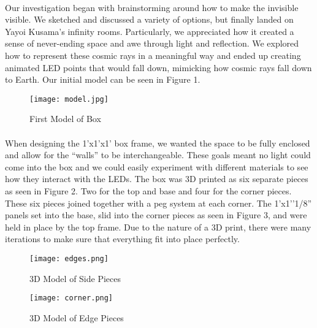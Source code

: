 \documentclass{article}
\begin{document}
\paragraph{}Our investigation began with brainstorming around how to make the invisible visible. We sketched and discussed a variety of options, but finally landed on Yayoi Kusama’s infinity rooms. Particularly, we appreciated how it created a sense of never-ending space and awe through light and reflection. We explored how to represent these cosmic rays in a meaningful way and ended up creating animated LED points that would fall down, mimicking how cosmic rays fall down to Earth. Our initial model can be seen in Figure 1.
\begin{figure}
    \centering
    \texttt{[image: model.jpg]}
    \caption{First Model of Box}
\end{figure}
\paragraph{}When designing the 1’x1’x1’ box frame, we wanted the space to be fully enclosed and allow for the “walls” to be interchangeable. These goals meant no light could come into the box and we could easily experiment with different materials to see how they interact with the LEDs. The box was 3D printed as six separate pieces as seen in Figure 2. Two for the top and base and four for the corner pieces. These six pieces joined together with a peg system at each corner. The 1’x1’’1/8” panels set into the base, slid into the corner pieces as seen in Figure 3, and were held in place by the top frame. Due to the nature of a 3D print, there were many iterations to make sure that everything fit into place perfectly. 
\begin{figure}
    \centering
    \texttt{[image: edges.png]}
    \caption{3D Model of Side Pieces}
\end{figure}
\begin{figure}
    \centering
    \texttt{[image: corner.png]}
    \caption{3D Model of Edge Pieces}
\end{figure}
\end{document}
